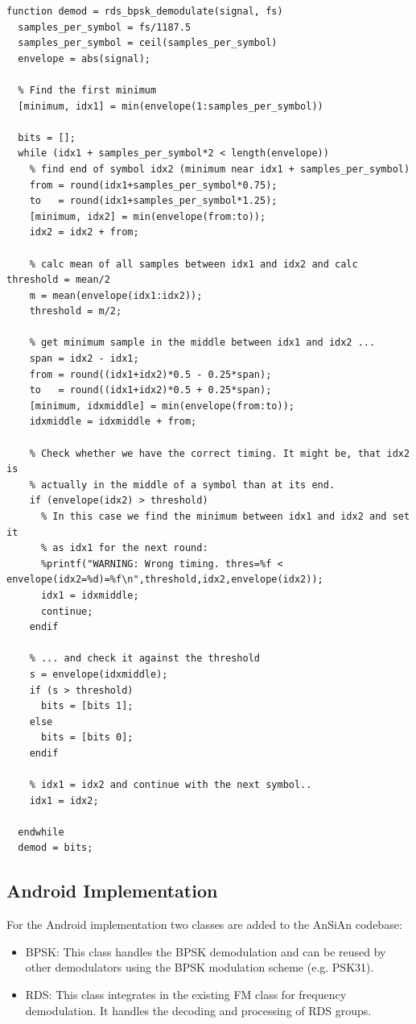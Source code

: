 \begin{lstlisting}[label=lst:octave_rds_bpsk, caption=Octave implementation of the BPSK demodulation, language=none]
function demod = rds_bpsk_demodulate(signal, fs)
  samples_per_symbol = fs/1187.5
  samples_per_symbol = ceil(samples_per_symbol)
  envelope = abs(signal);
  
  % Find the first minimum
  [minimum, idx1] = min(envelope(1:samples_per_symbol))
  
  bits = [];
  while (idx1 + samples_per_symbol*2 < length(envelope))
    % find end of symbol idx2 (minimum near idx1 + samples_per_symbol)
    from = round(idx1+samples_per_symbol*0.75);
    to   = round(idx1+samples_per_symbol*1.25);
    [minimum, idx2] = min(envelope(from:to));
    idx2 = idx2 + from;
    
    % calc mean of all samples between idx1 and idx2 and calc threshold = mean/2
    m = mean(envelope(idx1:idx2));
    threshold = m/2;
    
    % get minimum sample in the middle between idx1 and idx2 ...
    span = idx2 - idx1;
    from = round((idx1+idx2)*0.5 - 0.25*span);
    to   = round((idx1+idx2)*0.5 + 0.25*span);
    [minimum, idxmiddle] = min(envelope(from:to));
    idxmiddle = idxmiddle + from;
    
    % Check whether we have the correct timing. It might be, that idx2 is
    % actually in the middle of a symbol than at its end.
    if (envelope(idx2) > threshold)
      % In this case we find the minimum between idx1 and idx2 and set it
      % as idx1 for the next round:
      %printf("WARNING: Wrong timing. thres=%f < envelope(idx2=%d)=%f\n",threshold,idx2,envelope(idx2));
      idx1 = idxmiddle;
      continue;
    endif
    
    % ... and check it against the threshold
    s = envelope(idxmiddle);
    if (s > threshold)
      bits = [bits 1];
    else
      bits = [bits 0];
    endif
    
    % idx1 = idx2 and continue with the next symbol..
    idx1 = idx2;
    
  endwhile
  demod = bits;
\end{lstlisting}


\subsection{Android Implementation}

For the Android implementation two classes are added to the AnSiAn codebase:
\begin{itemize}
	\item BPSK: This class handles the \ac{BPSK} demodulation and can be
		reused by other demodulators using the \ac{BPSK} modulation scheme
		(e.g. PSK31).
	\item RDS: This class integrates in the existing FM class for frequency
		demodulation. It handles the decoding and processing of \ac{RDS}
		groups. 
\end{itemize}

